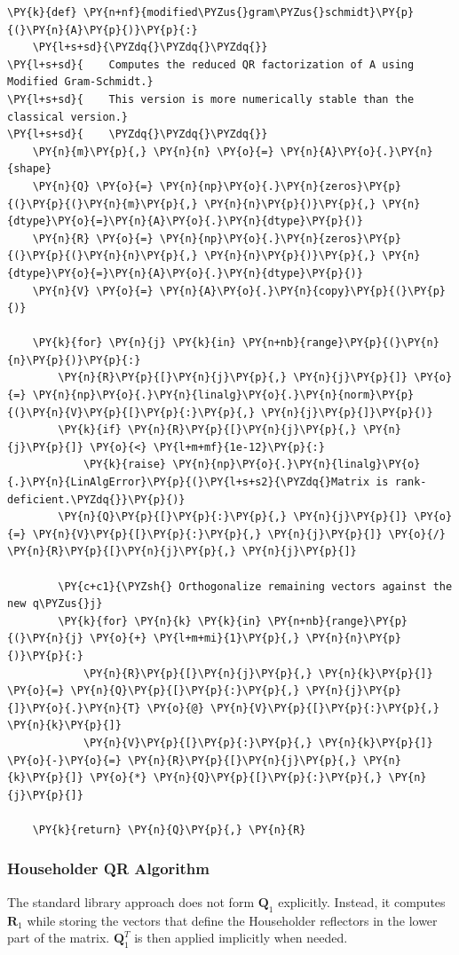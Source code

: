 \begin{verbatim}
\PY{k}{def} \PY{n+nf}{modified\PYZus{}gram\PYZus{}schmidt}\PY{p}{(}\PY{n}{A}\PY{p}{)}\PY{p}{:}
    \PY{l+s+sd}{\PYZdq{}\PYZdq{}\PYZdq{}}
\PY{l+s+sd}{    Computes the reduced QR factorization of A using Modified Gram-Schmidt.}
\PY{l+s+sd}{    This version is more numerically stable than the classical version.}
\PY{l+s+sd}{    \PYZdq{}\PYZdq{}\PYZdq{}}
    \PY{n}{m}\PY{p}{,} \PY{n}{n} \PY{o}{=} \PY{n}{A}\PY{o}{.}\PY{n}{shape}
    \PY{n}{Q} \PY{o}{=} \PY{n}{np}\PY{o}{.}\PY{n}{zeros}\PY{p}{(}\PY{p}{(}\PY{n}{m}\PY{p}{,} \PY{n}{n}\PY{p}{)}\PY{p}{,} \PY{n}{dtype}\PY{o}{=}\PY{n}{A}\PY{o}{.}\PY{n}{dtype}\PY{p}{)}
    \PY{n}{R} \PY{o}{=} \PY{n}{np}\PY{o}{.}\PY{n}{zeros}\PY{p}{(}\PY{p}{(}\PY{n}{n}\PY{p}{,} \PY{n}{n}\PY{p}{)}\PY{p}{,} \PY{n}{dtype}\PY{o}{=}\PY{n}{A}\PY{o}{.}\PY{n}{dtype}\PY{p}{)}
    \PY{n}{V} \PY{o}{=} \PY{n}{A}\PY{o}{.}\PY{n}{copy}\PY{p}{(}\PY{p}{)}

    \PY{k}{for} \PY{n}{j} \PY{k}{in} \PY{n+nb}{range}\PY{p}{(}\PY{n}{n}\PY{p}{)}\PY{p}{:}
        \PY{n}{R}\PY{p}{[}\PY{n}{j}\PY{p}{,} \PY{n}{j}\PY{p}{]} \PY{o}{=} \PY{n}{np}\PY{o}{.}\PY{n}{linalg}\PY{o}{.}\PY{n}{norm}\PY{p}{(}\PY{n}{V}\PY{p}{[}\PY{p}{:}\PY{p}{,} \PY{n}{j}\PY{p}{]}\PY{p}{)}
        \PY{k}{if} \PY{n}{R}\PY{p}{[}\PY{n}{j}\PY{p}{,} \PY{n}{j}\PY{p}{]} \PY{o}{<} \PY{l+m+mf}{1e-12}\PY{p}{:}
            \PY{k}{raise} \PY{n}{np}\PY{o}{.}\PY{n}{linalg}\PY{o}{.}\PY{n}{LinAlgError}\PY{p}{(}\PY{l+s+s2}{\PYZdq{}Matrix is rank-deficient.\PYZdq{}}\PY{p}{)}
        \PY{n}{Q}\PY{p}{[}\PY{p}{:}\PY{p}{,} \PY{n}{j}\PY{p}{]} \PY{o}{=} \PY{n}{V}\PY{p}{[}\PY{p}{:}\PY{p}{,} \PY{n}{j}\PY{p}{]} \PY{o}{/} \PY{n}{R}\PY{p}{[}\PY{n}{j}\PY{p}{,} \PY{n}{j}\PY{p}{]}

        \PY{c+c1}{\PYZsh{} Orthogonalize remaining vectors against the new q\PYZus{}j}
        \PY{k}{for} \PY{n}{k} \PY{k}{in} \PY{n+nb}{range}\PY{p}{(}\PY{n}{j} \PY{o}{+} \PY{l+m+mi}{1}\PY{p}{,} \PY{n}{n}\PY{p}{)}\PY{p}{:}
            \PY{n}{R}\PY{p}{[}\PY{n}{j}\PY{p}{,} \PY{n}{k}\PY{p}{]} \PY{o}{=} \PY{n}{Q}\PY{p}{[}\PY{p}{:}\PY{p}{,} \PY{n}{j}\PY{p}{]}\PY{o}{.}\PY{n}{T} \PY{o}{@} \PY{n}{V}\PY{p}{[}\PY{p}{:}\PY{p}{,} \PY{n}{k}\PY{p}{]}
            \PY{n}{V}\PY{p}{[}\PY{p}{:}\PY{p}{,} \PY{n}{k}\PY{p}{]} \PY{o}{-}\PY{o}{=} \PY{n}{R}\PY{p}{[}\PY{n}{j}\PY{p}{,} \PY{n}{k}\PY{p}{]} \PY{o}{*} \PY{n}{Q}\PY{p}{[}\PY{p}{:}\PY{p}{,} \PY{n}{j}\PY{p}{]}

    \PY{k}{return} \PY{n}{Q}\PY{p}{,} \PY{n}{R}
\end{verbatim}

\subsubsection*{Householder QR Algorithm}
The standard library approach does not form $\mathbf{Q}_1$ explicitly. Instead, it computes $\mathbf{R}_1$ while storing the vectors that define the Householder reflectors in the lower part of the matrix. $\mathbf{Q}_1^T$ is then applied implicitly when needed.

